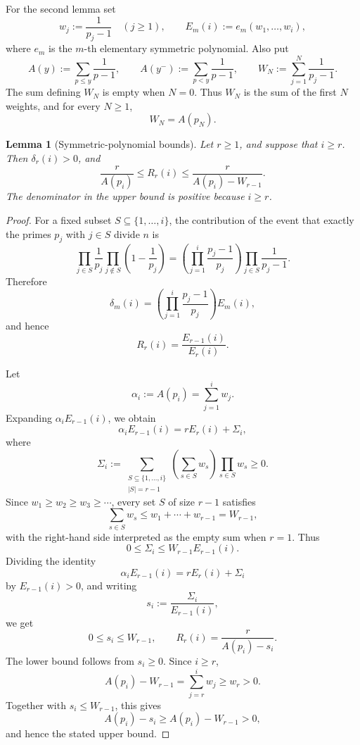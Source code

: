 \documentclass[11pt]{article}
\numberwithin{equation}{section}
\theoremstyle{plain}
\newtheorem{lemma}[theorem]{Lemma}
\theoremstyle{definition}
\theoremstyle{remark}
\begin{document}
For the second lemma set
\[
        w_j:=\frac1{p_j-1}\quad(j\ge1),
        \qquad
        E_m(i):=e_m(w_1,\ldots,w_i),
\]
where \(e_m\) is the \(m\)-th elementary symmetric polynomial.  Also put
\[
        A(y):=\sum_{p\le y}\frac1{p-1},
        \qquad
        A(y^-):=\sum_{p<y}\frac1{p-1},
        \qquad
        W_N:=\sum_{j=1}^{N}\frac1{p_j-1}.
\]
The sum defining \(W_N\) is empty when \(N=0\).  Thus \(W_N\) is the sum of the first \(N\) weights, and for every \(N\ge1\),
\[
        W_N=A(p_N).
\]

\begin{lemma}[Symmetric-polynomial bounds]\label{lem:Rbounds}
Let \(r\ge 1\), and suppose that \(i\ge r\).  Then \(\delta_r(i)>0\), and
\[
        \frac r{A(p_i)}
        \le
        R_r(i)
        \le
        \frac r{A(p_i)-W_{r-1}} .
\]
The denominator in the upper bound is positive because \(i\ge r\).
\end{lemma}

\begin{proof}
For a fixed subset \(S\subseteq\{1,\ldots,i\}\), the contribution of the event that exactly the primes \(p_j\) with \(j\in S\) divide \(n\) is
\[
        \prod_{j\in S}\frac1{p_j}
        \prod_{j\notin S}\left(1-\frac1{p_j}\right)
        =
        \left(\prod_{j=1}^i\frac{p_j-1}{p_j}\right)
        \prod_{j\in S}\frac1{p_j-1}.
\]
Therefore
\[
        \delta_m(i)
        =
        \left(\prod_{j=1}^i\frac{p_j-1}{p_j}\right)E_m(i),
\]
and hence
\[
        R_r(i)=\frac{E_{r-1}(i)}{E_r(i)}.
\]

Let
\[
        \alpha_i:=A(p_i)=\sum_{j=1}^i w_j .
\]
Expanding \(\alpha_iE_{r-1}(i)\), we obtain
\[
        \alpha_iE_{r-1}(i)=rE_r(i)+\Sigma_i,
\]
where
\[
        \Sigma_i
        :=
        \sum_{\substack{S\subseteq\{1,\ldots,i\}\\ |S|=r-1}}
        \left(\sum_{s\in S}w_s\right)\prod_{s\in S}w_s
        \ge 0.
\]
Since \(w_1\ge w_2\ge w_3\ge\cdots\), every set \(S\) of size \(r-1\) satisfies
\[
        \sum_{s\in S}w_s\le w_1+\cdots+w_{r-1}=W_{r-1},
\]
with the right-hand side interpreted as the empty sum when \(r=1\).
Thus
\[
        0\le \Sigma_i\le W_{r-1}E_{r-1}(i).
\]
Dividing the identity
\[
        \alpha_iE_{r-1}(i)=rE_r(i)+\Sigma_i
\]
by \(E_{r-1}(i)>0\), and writing
\[
        s_i:=\frac{\Sigma_i}{E_{r-1}(i)},
\]
we get
\[
        0\le s_i\le W_{r-1},
        \qquad
        R_r(i)=\frac r{A(p_i)-s_i}.
\]
The lower bound follows from \(s_i\ge 0\).  Since \(i\ge r\),
\[
        A(p_i)-W_{r-1}
        =\sum_{j=r}^{i}w_j
        \ge w_r>0.
\]
Together with \(s_i\le W_{r-1}\), this gives
\[
        A(p_i)-s_i\ge A(p_i)-W_{r-1}>0,
\]
and hence the stated upper bound.
\end{proof}
\end{document}
